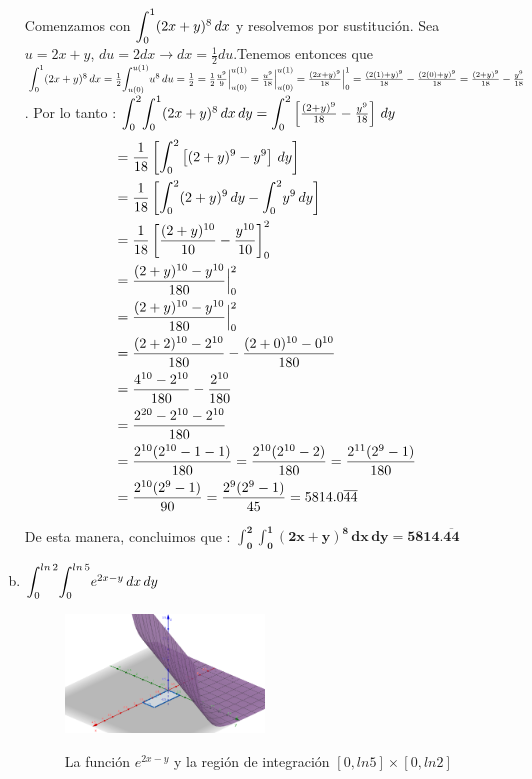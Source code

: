 \documentclass[12pt]{exam}
\begin{document}
\begin{questions}
\begin{enumerate}[a)]
       Comenzamos con  $\mathlarger{\int}_0^{1}(2x+y)^8\,dx$ y resolvemos por sustitución.
       Sea $u = 2x+y$, $du = 2dx \rightarrow dx=\frac{1}{2}du$.Tenemos entonces que $\mathlarger{\int}_0^{1}(2x+y)^8\,dx = \frac{1}{2}\mathlarger{\int}_{u(0)}^{u(1)}u^8\,du = \frac{1}{2} = \frac{1}{2}\frac{u^9}{9}\Big| _{u(0)}^{u(1)} = \frac{u^9}{18}\Big| _{u(0)}^{u(1)}=  \frac{(2x+y)^9}{18}\Big| _{0}^{1} = \frac{(2(1)+y)^9}{18} -  \frac{(2(0)+y)^9}{18} =   \frac{(2+y)^9}{18} -\frac{y^9}{18}$. Por lo tanto :   $\mathlarger{\int}_0^2\mathlarger{\int}_0^{1}(2x+y)^8\,dx\,dy =  \mathlarger{\int}_0^2  \left[ \frac{(2+y)^9}{18} -\frac{y^9}{18}\right]  \,dy $ \\
        \begin{align*}
          &= \frac{1}{18} \left[  \mathlarger{\int}_0^2  \left[ (2+y)^9 -y^9\right]  \,dy \right] \\
          &= \frac{1}{18} \left[  \mathlarger{\int}_0^2  (2+y)^9 \,dy -  \mathlarger{\int}_0^2 y^9  \,dy \right] \\
          &= \frac{1}{18} \left[  \frac{(2+y)^{10}}{10} -  \frac{y^{10}}{10} \right]_{0}^{2} \\
           &=  \frac{(2+y)^{10}-y^{10}}{180} \Big|_{0}^{2} \\
          &=  \frac{(2+y)^{10}-y^{10}}{180} \Big|_{0}^{2} \\
          &=  \frac{(2+2)^{10}-2^{10}}{180} - \frac{(2+0)^{10}-0^{10}}{180} \\
          &=  \frac{4^{10}-2^{10}}{180} - \frac{2^{10}}{180} \\
          &=  \frac{2^{20}-2^{10}-2^{10}}{180}  \\
          &= \frac{2^{10} (2^{10}-1-1)}{180} = \frac{2^{10} (2^{10}-2)}{180} =\frac{2^{11} (2^{9}-1)}{180}  \\
            &= \frac{2^{10} (2^{9}-1)}{90} =   \frac{2^{9} (2^{9}-1)}{45} = 5814.0\overline{44}
        \end{align*}
        
       De esta manera, concluimos que : $\boldsymbol{\int_0^2 \int_0^1 (2x + y)^8 \, dx \, dy = 5814.\overline{44}}$
     \item $\mathlarger{\int}_{0}^{ln\,2}\mathlarger{\int}_{0}^{ln\,5}e^{2x-y}\,dx\,dy$
        \begin{figure}[h]
      \centering
      \includegraphics[width=0.5\textwidth]{./img/i2e3.png}
      \label{fig:región}
      \caption{La función $e^{2x-y}$ y la región de integración $[0,ln5]\times[0,ln2]$}
        \end{figure}
  

\end{enumerate}
\end{questions}
\end{document}
